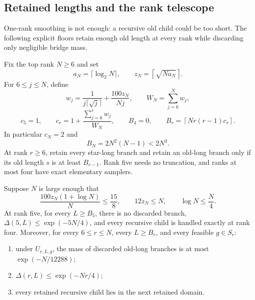 \subsection{Retained lengths and the rank telescope}

One-rank smoothing is not enough: a recursive old child could be too short.
The following explicit floors retain enough old length at every rank while
discarding only negligible bridge mass.

Fix the top rank $N\ge6$ and set
\[
  a_N=\lceil\log_2N\rceil,\qquad
  z_N=\left\lceil\sqrt{Na_N}\right\rceil.
\]
For $6\le j\le N$, define
\[
  w_j=\frac{1}{j\lceil\sqrt j\rceil}+\frac{100z_N}{Nj},
  \qquad
  W_N=\sum_{j=6}^Nw_j,
  \tag{RR.18}
\]
\[
  c_5=1,\qquad
  c_r=1+\frac{\sum_{j=6}^r w_j}{W_N},
  \qquad
  B_4=0,\qquad
  B_r=\left\lceil Nr(r-1)c_r\right\rceil.
  \tag{RR.19}
\]
In particular $c_N=2$ and
\[
  B_N=2N^2(N-1)<2N^3.
  \tag{RR.20}
\]
At rank $r\ge6$, retain every star-long branch and retain an old-long branch
only if its old length $s$ is at least $B_{r-1}$.  Rank five needs no
truncation, and ranks at most four have exact elementary samplers.

\begin{lemma}
\label{lem:retained-rank}
Suppose $N$ is large enough that
\[
  \frac{100z_N(1+\log N)}{N}\le\frac{15}{8},
  \qquad 12z_N\le N,\qquad \log N\le\frac N4.
  \tag{RR.21}
\]
At rank five, for every $L\ge B_5$, there is no discarded branch,
$\Delta(5,L)\le\exp(-5N/4)$, and every recursive child is handled exactly at
rank four.  Moreover, for every $6\le r\le N$, every $L\ge B_r$, and every feasible
$g\in S_r$:
\begin{enumerate}
\item under $U_{r,L,g}$, the mass of discarded old-long branches is at most
  $\exp(-N/12288)$;
\item $\Delta(r,L)\le\exp(-Nr/4)$;
\item every retained recursive child lies in the next retained domain.
\end{enumerate}
\end{lemma}

